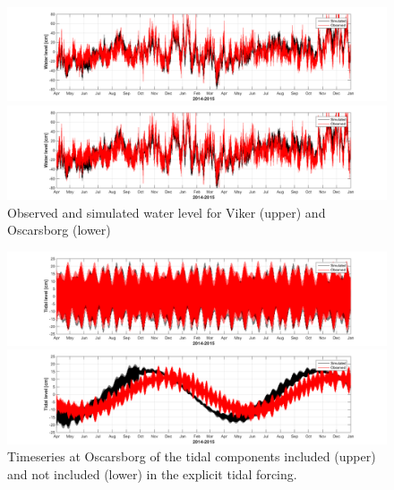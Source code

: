 \documentclass[12pt,a4paper,english]{article}
\begin{document}
\begin{figure}[t]
\centerline{
\includegraphics*[trim=3cm 0cm 2.5cm 0cm,clip=true,width=\textwidth]{Figurer/Viker_WL} 
}
\centerline{
\includegraphics*[trim=3cm 0cm 2.5cm 0cm,clip=true,width=\textwidth]{Figurer/Oscarsborg_WL}
}
\caption{\small
Observed and simulated water level for Viker (upper) and Oscarsborg (lower)}
\label{fig:Waterlevel}
\end{figure}


\begin{figure}[t]
\centerline{
\includegraphics*[trim=3cm 0cm 2.5cm 0cm,clip=true,width=\textwidth]{Figurer/Oscarsborg_Tide_selected}
}
\centerline{
\includegraphics*[trim=3cm 0cm 2.5cm 0cm,clip=true,width=\textwidth]{Figurer/Oscarsborg_Tide_NorKyst800} 
}
\caption{\small
Timeseries at Oscarsborg of the tidal components included (upper) and not included (lower) in the explicit tidal forcing.}
\label{fig:Waterlevel_tide}
\end{figure}
\end{document}
